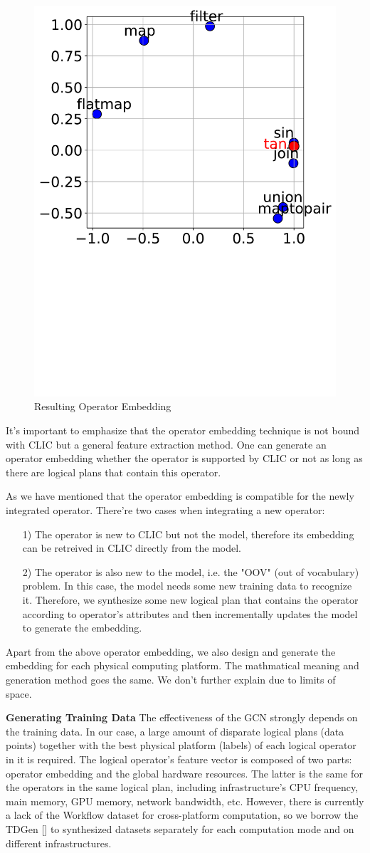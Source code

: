 \begin{figure}
    \centering
    \includegraphics[width=0.4\linewidth]{figures/embedding_visual.pdf}
    \caption{Resulting Operator Embedding}
    \label{fig:embedding_panel}
\end{figure}

It's important to emphasize that the operator embedding technique is not bound with CLIC but a general feature extraction method. 
One can generate an operator embedding whether the operator is supported by CLIC or not as long as there are logical plans that contain this operator.

As we have mentioned that the operator embedding is compatible for the newly integrated operator. 
There're two cases when integrating a new operator:
\begin{itemize}
    \item [1)]
    The operator is new to CLIC but not the model, therefore its embedding can be retreived in CLIC directly from the model.
    \item [2)]
    The operator is also new to the model, i.e. the "OOV" (out of vocabulary) problem. 
    In this case, the model needs some new training data to recognize it. 
    Therefore, we synthesize some new logical plan that contains the operator according to operator's attributes and then incrementally updates the model to generate the embedding.
\end{itemize}

Apart from the above operator embedding, 
we also design and generate the embedding for each physical computing platform. 
The mathmatical meaning and generation method goes the same. 
We don't further explain due to limits of space.


\textbf{Generating Training Data}
The effectiveness of the GCN strongly depends on the training data. 
In our case, a large amount of disparate logical plans (data points) together with the best physical platform (labels) of each logical operator in it is required. 
The logical operator's feature vector is composed of two parts: operator embedding and the global hardware resources. 
The latter is the same for the operators in the same logical plan, including infrastructure's CPU frequency, main memory, GPU memory, network bandwidth, etc. 
However, there is currently a lack of the Workflow dataset for cross-platform computation, so we borrow the TDGen [] to synthesized datasets separately for each computation mode and on different infrastructures.